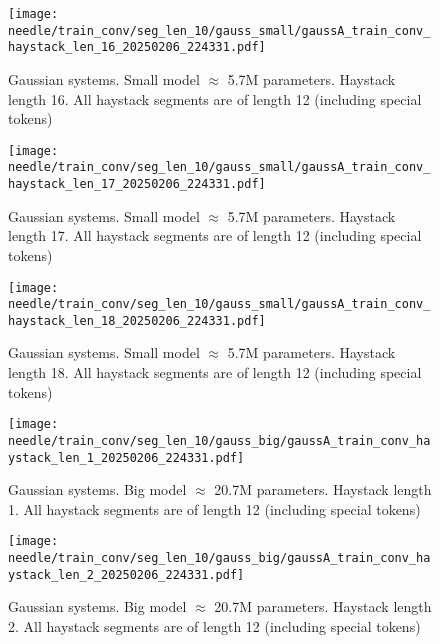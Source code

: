 \begin{figure}[h]
    \centering
    \texttt{[image: needle/train\_conv/seg\_len\_10/gauss\_small/gaussA\_train\_conv\_haystack\_len\_16\_20250206\_224331.pdf]}
    \caption{Gaussian systems. Small model $\approx$ 5.7M parameters. Haystack length 16. All haystack segments are of length 12 (including special tokens)}
    \label{fig:gauss_small_needle_train_conv_haystack_len_16_all_haystack_len_12}

\end{figure}

\begin{figure}[h]
    \centering
    \texttt{[image: needle/train\_conv/seg\_len\_10/gauss\_small/gaussA\_train\_conv\_haystack\_len\_17\_20250206\_224331.pdf]}
    \caption{Gaussian systems. Small model $\approx$ 5.7M parameters. Haystack length 17. All haystack segments are of length 12 (including special tokens)}
    \label{fig:gauss_small_needle_train_conv_haystack_len_17_all_haystack_len_12}

\end{figure}

\begin{figure}[h]
    \centering
    \texttt{[image: needle/train\_conv/seg\_len\_10/gauss\_small/gaussA\_train\_conv\_haystack\_len\_18\_20250206\_224331.pdf]}
    \caption{Gaussian systems. Small model $\approx$ 5.7M parameters. Haystack length 18. All haystack segments are of length 12 (including special tokens)}
    \label{fig:gauss_small_needle_train_conv_haystack_len_18_all_haystack_len_12}

\end{figure}


\begin{figure}[h]
    \centering
    \texttt{[image: needle/train\_conv/seg\_len\_10/gauss\_big/gaussA\_train\_conv\_haystack\_len\_1\_20250206\_224331.pdf]}
    \caption{Gaussian systems. Big model $\approx$ 20.7M parameters. Haystack length 1. All haystack segments are of length 12 (including special tokens)}
    \label{fig:gauss_small_needle_train_conv_haystack_len_1_all_haystack_len_12}

\end{figure}

\begin{figure}[h]
    \centering
    \texttt{[image: needle/train\_conv/seg\_len\_10/gauss\_big/gaussA\_train\_conv\_haystack\_len\_2\_20250206\_224331.pdf]}
    \caption{Gaussian systems. Big model $\approx$ 20.7M parameters. Haystack length 2. All haystack segments are of length 12 (including special tokens)}
    \label{fig:gauss_small_needle_train_conv_haystack_len_2_all_haystack_len_12}

\end{figure}

